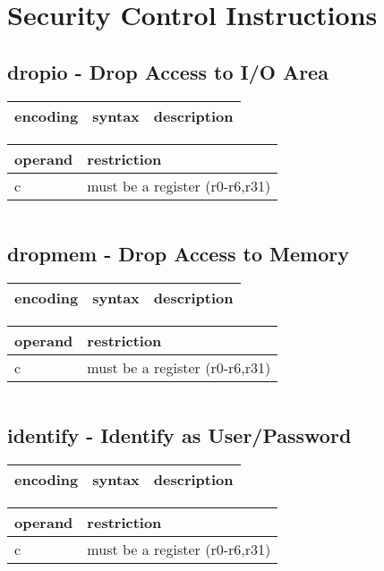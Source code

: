 \documentclass[letterpaper,10pt,openright,twoside,onecolumn]{book}
\begin{document}
\clearpage\section{Security Control Instructions}
\subsection{dropio - Drop Access to I/O Area}
  \begin{tabular}{|l|l|l|}
   \hline
    encoding & syntax & description \\
   \hline
   \hline
  \end{tabular}
  \flushleft
  \begin{tabular}{|l|l|}
   \hline
    operand & restriction \\
   \hline
    c & must be a register (r0-r6,r31) \\
   \hline
  \end{tabular}
  \begin{verbatim}
  \end{verbatim}
\newpage\subsection{dropmem - Drop Access to Memory}
  \begin{tabular}{|l|l|l|}
   \hline
    encoding & syntax & description \\
   \hline
   \hline
  \end{tabular}
  \flushleft
  \begin{tabular}{|l|l|}
   \hline
    operand & restriction \\
   \hline
    c & must be a register (r0-r6,r31) \\
   \hline
  \end{tabular}
  \begin{verbatim}
  \end{verbatim}
\newpage\subsection{identify - Identify as User/Password}
  \begin{tabular}{|l|l|l|}
   \hline
    encoding & syntax & description \\
   \hline
   \hline
  \end{tabular}
  \flushleft
  \begin{tabular}{|l|l|}
   \hline
    operand & restriction \\
   \hline
    c & must be a register (r0-r6,r31) \\
   \hline
  \end{tabular}
\end{document}

